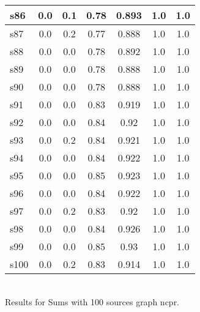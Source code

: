 \documentclass{article}
\begin{document}
\begin{tabular}{|l|c|c|c|c|c|c|}
\hline
s86 &0.0 & 0.1 & 0.78 & 0.893 & 1.0 & 1.0\\
\hline
s87 &0.0 & 0.2 & 0.77 & 0.888 & 1.0 & 1.0\\
\hline
s88 &0.0 & 0.0 & 0.78 & 0.892 & 1.0 & 1.0\\
\hline
s89 &0.0 & 0.0 & 0.78 & 0.888 & 1.0 & 1.0\\
\hline
s90 &0.0 & 0.0 & 0.78 & 0.888 & 1.0 & 1.0\\
\hline
s91 &0.0 & 0.0 & 0.83 & 0.919 & 1.0 & 1.0\\
\hline
s92 &0.0 & 0.0 & 0.84 & 0.92 & 1.0 & 1.0\\
\hline
s93 &0.0 & 0.2 & 0.84 & 0.921 & 1.0 & 1.0\\
\hline
s94 &0.0 & 0.0 & 0.84 & 0.922 & 1.0 & 1.0\\
\hline
s95 &0.0 & 0.0 & 0.85 & 0.923 & 1.0 & 1.0\\
\hline
s96 &0.0 & 0.0 & 0.84 & 0.922 & 1.0 & 1.0\\
\hline
s97 &0.0 & 0.2 & 0.83 & 0.92 & 1.0 & 1.0\\
\hline
s98 &0.0 & 0.0 & 0.84 & 0.926 & 1.0 & 1.0\\
\hline
s99 &0.0 & 0.0 & 0.85 & 0.93 & 1.0 & 1.0\\
\hline
s100 &0.0 & 0.2 & 0.83 & 0.914 & 1.0 & 1.0\\
\hline
\end{tabular}\\

\noindent Results for Sums with 100 sources graph ncpr.
\end{document}
